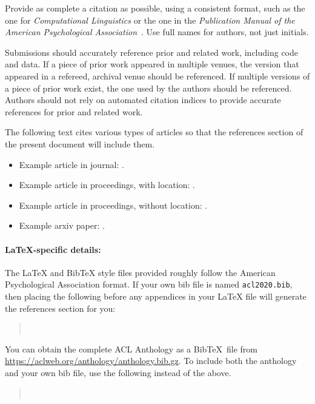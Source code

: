 \documentclass[11pt,a4paper]{article}
\begin{document}
Provide as complete a citation as possible, using a consistent format, such as the one for \emph{Computational Linguistics\/} or the one in the  \emph{Publication Manual of the American 
Psychological Association\/}~\citep{APA:83}.
Use full names for authors, not just initials.

Submissions should accurately reference prior and related work, including code and data.
If a piece of prior work appeared in multiple venues, the version that appeared in a refereed, archival venue should be referenced.
If multiple versions of a piece of prior work exist, the one used by the authors should be referenced.
Authors should not rely on automated citation indices to provide accurate references for prior and related work.

The following text cites various types of articles so that the references section of the present document will include them.
\begin{itemize}
\item Example article in journal: \citep{Ando2005}.
\item Example article in proceedings, with location: \citep{borschinger-johnson-2011-particle}.
\item Example article in proceedings, without location: \citep{andrew2007scalable}.
\item Example arxiv paper: \citep{rasooli-tetrault-2015}. 
\end{itemize}


\paragraph{\LaTeX-specific details:}
The \LaTeX{} and Bib\TeX{} style files provided roughly follow the American Psychological Association format.
If your own bib file is named \texttt{\small acl2020.bib}, then placing the following before any appendices in your \LaTeX{}  file will generate the references section for you:
\begin{quote}\small
\verb||\\
\verb||
\end{quote}

You can obtain the complete ACL Anthology as a Bib\TeX\ file from \url{https://aclweb.org/anthology/anthology.bib.gz}.
To include both the anthology and your own bib file, use the following instead of the above.
\begin{quote}\small
\verb||\\
\verb||
\end{quote}
\end{document}
